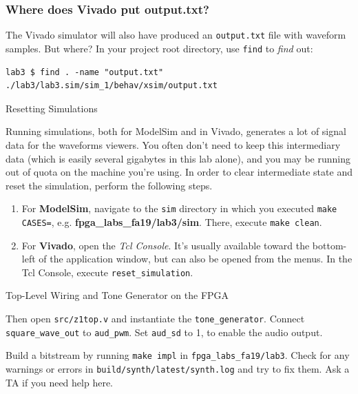 \documentclass[11pt]{article}
\makeatletter
\newcommand{\RepoRootPath}{fpga\_labs\_fa19}
\renewcommand{\section}
{\@startsection {section}{1}{0pt}
 {-2ex}
 {1ex}
 {\bfseries\Large}}
\renewcommand{\subsection}
{\@startsection {subsection}{1}{0pt}
 {-1ex}
 {0.5ex}
 {\bfseries\normalsize}}
\makeatother
\begin{document}
\subsubsection{Where does Vivado put output.txt?}

The Vivado simulator will also have produced an \verb|output.txt| file with waveform samples. But where? In your project root directory, use \verb|find| to \emph{find} out:

\begin{verbatim}
lab3 $ find . -name "output.txt"
./lab3/lab3.sim/sim_1/behav/xsim/output.txt
\end{verbatim}

\subsection{Resetting Simulations}

Running simulations, both for ModelSim and in Vivado, generates a lot of signal data for the waveforms viewers. You often don't need to keep this intermediary data (which is easily several gigabytes in this lab alone), and you may be running out of quota on the machine you're using. In order to clear intermediate state and reset the simulation, perform the following steps.

\begin{enumerate}
  \item For \textbf{ModelSim}, navigate to the \verb|sim| directory in which you executed \verb|make CASES=|, e.g. \textbf{\RepoRootPath/lab3/sim}. There, execute \verb|make clean|.
  \item For \textbf{Vivado}, open the \emph{Tcl Console}. It's usually available toward the bottom-left of the application window, but can also be opened from the menus. In the Tcl Console, execute \verb|reset_simulation|.
\end{enumerate}

\section{Top-Level Wiring and Tone Generator on the FPGA}

Then open \verb|src/z1top.v| and instantiate the \verb|tone_generator|.
Connect \verb|square_wave_out| to \verb|aud_pwm|.
Set \verb|aud_sd| to 1, to enable the audio output.

Build a bitstream by running \texttt{make impl} in \texttt{\RepoRootPath/lab3}.
Check for any warnings or errors in \texttt{build/synth/latest/synth.log} and try to fix them.
Ask a TA if you need help here.
\end{document}
